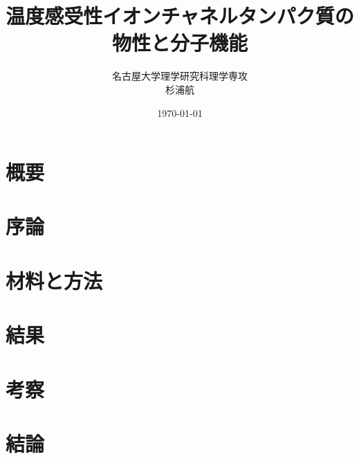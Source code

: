 \documentclass{ltjsreport}
\title{温度感受性イオンチャネルタンパク質の物性と分子機能}
\author{名古屋大学理学研究科理学専攻\\杉浦航}
\date{\today}
\begin{document}
\maketitle

\chapter*{概要}


\tableofcontents
\clearpage

\chapter{序論}


\chapter{材料と方法}


\chapter{結果}


\chapter{考察}


\chapter{結論}

\end{document}
